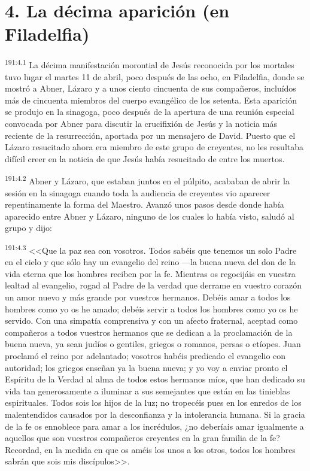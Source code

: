\section*{4. La décima aparición (en Filadelfia)}
\par 
\textsuperscript{191:4.1} La décima manifestación morontial de Jesús reconocida por los mortales tuvo lugar el martes 11 de abril, poco después de las ocho, en Filadelfia, donde se mostró a Abner, Lázaro y a unos ciento cincuenta de sus compañeros, incluídos más de cincuenta miembros del cuerpo evangélico de los setenta. Esta aparición se produjo en la sinagoga, poco después de la apertura de una reunión especial convocada por Abner para discutir la crucifixión de Jesús y la noticia más reciente de la resurrección, aportada por un mensajero de David. Puesto que el Lázaro resucitado ahora era miembro de este grupo de creyentes, no les resultaba difícil creer en la noticia de que Jesús había resucitado de entre los muertos.

\par 
\textsuperscript{191:4.2} Abner y Lázaro, que estaban juntos en el púlpito, acababan de abrir la sesión en la sinagoga cuando toda la audiencia de creyentes vio aparecer repentinamente la forma del Maestro. Avanzó unos pasos desde donde había aparecido entre Abner y Lázaro, ninguno de los cuales lo había visto, saludó al grupo y dijo:

\par 
\textsuperscript{191:4.3} <<Que la paz sea con vosotros. Todos sabéis que tenemos un solo Padre en el cielo y que sólo hay un evangelio del reino ---la buena nueva del don de la vida eterna que los hombres reciben por la fe. Mientras os regocijáis en vuestra lealtad al evangelio, rogad al Padre de la verdad que derrame en vuestro corazón un amor nuevo y más grande por vuestros hermanos. Debéis amar a todos los hombres como yo os he amado; debéis servir a todos los hombres como yo os he servido. Con una simpatía comprensiva y con un afecto fraternal, aceptad como compañeros a todos vuestros hermanos que se dedican a la proclamación de la buena nueva, ya sean judíos o gentiles, griegos o romanos, persas o etíopes. Juan proclamó el reino por adelantado; vosotros habéis predicado el evangelio con autoridad; los griegos enseñan ya la buena nueva; y yo voy a enviar pronto el Espíritu de la Verdad al alma de todos estos hermanos míos, que han dedicado su vida tan generosamente a iluminar a sus semejantes que están en las tinieblas espirituales. Todos sois los hijos de la luz; no tropecéis pues en los enredos de los malentendidos causados por la desconfianza y la intolerancia humana. Si la gracia de la fe os ennoblece para amar a los incrédulos, ¿no deberíais amar igualmente a aquellos que son vuestros compañeros creyentes en la gran familia de la fe? Recordad, en la medida en que os améis los unos a los otros, todos los hombres sabrán que sois mis discípulos>>.


